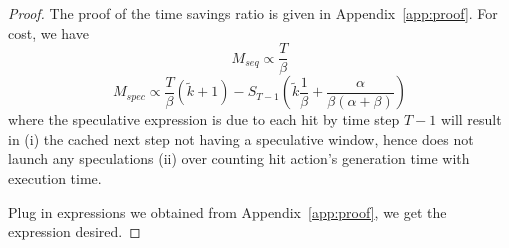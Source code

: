 \begin{proof}
 The proof of the time savings ratio is given in Appendix~\ref{app:proof}. For cost, we have
    \[M_{seq} \propto \frac{T}{\beta}\]
    \[M_{spec} \propto \frac{T}{\beta}(\tilde{k}+1) - S_{T-1}\left(\tilde{k}\frac{1}{\beta} +\frac{\alpha}{\beta(\alpha+\beta)}\right)\]
    where the speculative expression is due to each hit by time step $T-1$ will result in (i) the cached next step not having a speculative window, hence does not launch any speculations (ii) over counting hit action's generation time with execution time.

    Plug in expressions we obtained from Appendix~\ref{app:proof}, we get the expression desired.
\end{proof}




